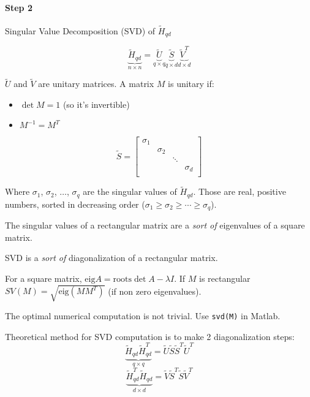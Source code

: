 \newpage
{}

\paragraph{Step 2} Singular Value Decomposition (SVD) of $\tilde{H}_{qd}$

\[
    \underbrace{\tilde{H}_{qd}}_{n\times n} = \underbrace{\tilde{U}}_{q\times q} \underbrace{\tilde{S}}_{q\times d} \underbrace{\tilde{V}^T}_{d\times d}
\]

$\tilde{U}$ and $\tilde{V}$ are unitary matrices. A matrix $M$ is unitary if:
\begin{itemize}
    \item $\det M = 1$ (so it's invertible)
    \item $M^{-1} = M^T$
\end{itemize}

\[
    \tilde{S} = \begin{bmatrix}
        \sigma_1 & & & \\
        & \sigma_2 & & \\
        & & \ddots & \\
        & &  & \sigma_d \\
    \end{bmatrix}
\]

Where $\sigma_1$, $\sigma_2$, $\ldots$, $\sigma_q$ are the singular values of $\tilde{H}_{qd}$.
Those are real, positive numbers, sorted in decreasing order ($\sigma_1 \ge \sigma_2 \ge \cdots \ge \sigma_q$).

\begin{remark}
    The singular values of a rectangular matrix are a \emph{sort of} eigenvalues of a square matrix.
\end{remark}

SVD is a \emph{sort of} diagonalization of a rectangular matrix.

\begin{remark}
    For a square matrix, $\text{eig} A = \text{roots} \det A-\lambda I$. If $M$ is rectangular $SV(M) = \sqrt{\text{eig}(MM^T)}$ (if non zero eigenvalues).
\end{remark}

\begin{remark}
    The optimal numerical computation is not trivial. Use \texttt{svd(M)} in Matlab.

    Theoretical method for SVD computation is to make 2 diagonalization steps:
    \[
        \underbrace{\tilde{H}_{qd} \tilde{H}_{qd}^T}_{q\times q} = \tilde{U}\tilde{S}\tilde{S}^T\tilde{U}^T
    \]
    \[
        \underbrace{\tilde{H}_{qd}^T \tilde{H}_{qd}}_{d\times d} = \tilde{V}\tilde{S}^T\tilde{S}\tilde{V}^T
    \]
\end{remark}

